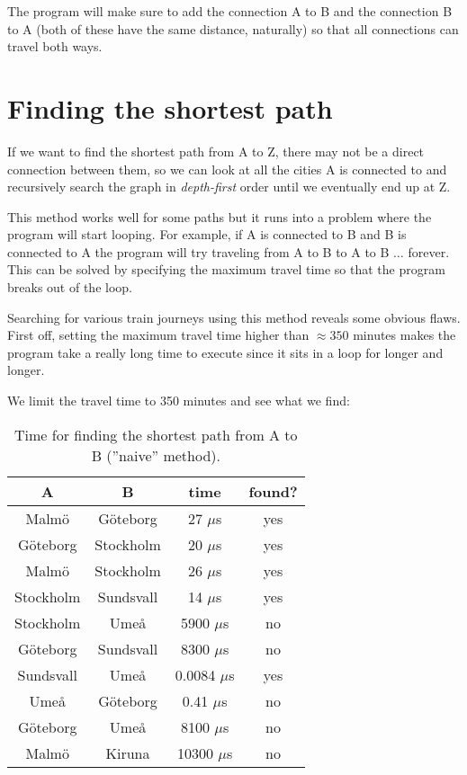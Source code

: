 \documentclass[a4paper,11pt]{article}
\begin{document}
The program will make sure to add the connection A to B and the connection B to A (both of these have the same distance, naturally) so that all connections can travel both ways.

\section*{Finding the shortest path}

If we want to find the shortest path from A to Z, there may not be a direct connection between them,
so we can look at all the cities A is connected to and recursively search the graph in \emph{depth-first} order until we eventually end up at Z.

This method works well for some paths but it runs into a problem where the program will start looping.
For example, if A is connected to B and B is connected to A the program will try traveling from A to B to A to B $\ldots$ forever.
This can be solved by specifying the maximum travel time so that the program breaks out of the loop.

Searching for various train journeys using this method reveals some obvious flaws.
First off, setting the maximum travel time higher than $\approx 350$ minutes makes the program take a really long time to execute since it sits in a loop for longer and longer.

We limit the travel time to 350 minutes and see what we find:

\begin{table}[H]
\centering
\begin{tabular}{|c|c|c|c|}
\hline
\textbf{A} & \textbf{B} & \textbf{time} & \textbf{found?} \\
\hline
	Malmö & Göteborg & 27 $\mu$s & yes \\
	Göteborg & Stockholm & 20 $\mu$s & yes \\
	Malmö & Stockholm & 26 $\mu$s & yes \\
	Stockholm & Sundsvall & 14 $\mu$s & yes \\
	Stockholm & Umeå & 5900 $\mu$s & no \\
	Göteborg & Sundsvall & 8300 $\mu$s & no \\
	Sundsvall & Umeå & 0.0084 $\mu$s & yes \\
	Umeå & Göteborg & 0.41 $\mu$s & no \\
	Göteborg & Umeå & 8100 $\mu$s & no \\
	Malmö & Kiruna & 10300 $\mu$s & no \\
\hline
\end{tabular}
\caption{Time for finding the shortest path from A to B (''naive'' method).}
\label{tab:table1}
\end{table}
\end{document}
